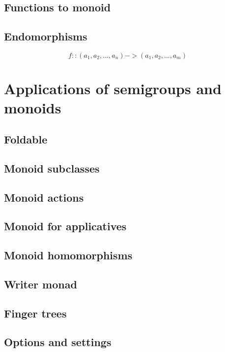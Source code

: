 \documentclass{article}
\begin{document}
    \subsection{Functions to monoid}

    \subsection{Endomorphisms}

    \begin{equation}
        f :: (a_1, a_2, ..., a_n) -> (a_1, a_2, ..., a_m)
    \end{equation}

    \section{Applications of semigroups and monoids}

    \subsection{Foldable}

    \subsection{Monoid subclasses}

    \subsection{Monoid actions}

    \subsection{Monoid for applicatives}

    \subsection{Monoid homomorphisms}

    \subsection{Writer monad}

    \subsection{Finger trees}

    \subsection{Options and settings}
\end{document}
